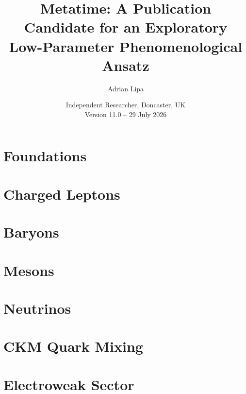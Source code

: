 \documentclass[11pt,a4paper,twoside]{book}
\theoremstyle{definition}
\begin{document}
\raggedbottom
\frontmatter
\title{Metatime: A Publication Candidate for an Exploratory\\Low-Parameter Phenomenological Ansatz}
\author{Adrian Lipa}
\date{Independent Researcher, Doncaster, UK\\Version 11.0 -- 29 July 2026}
\maketitle

\tableofcontents
\mainmatter

\part{Foundations}




\part{Charged Leptons}



\part{Baryons}






\part{Mesons}


\part{Neutrinos}


\part{CKM Quark Mixing}


\part{Electroweak Sector}





\end{document}
